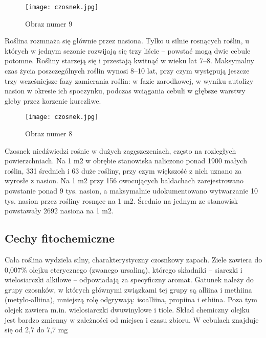 \begin{figure}
 \centering
 \texttt{[image: czosnek.jpg]}
 \caption{Obraz numer 9}
 \label{figure:example2}
\end{figure}

Roślina rozmnaża się głównie przez nasiona. Tylko u silnie rosnących roślin, u których w jednym sezonie rozwijają się trzy liście – powstać mogą dwie cebule potomne. Rośliny starzeją się i przestają kwitnąć w wieku lat 7–8. Maksymalny czas życia poszczególnych roślin wynosi 8–10 lat, przy czym występują jeszcze trzy wcześniejsze fazy zamierania roślin: w fazie zarodkowej, w wyniku autolizy nasion w okresie ich spoczynku, podczas wciągania cebuli w głębsze warstwy gleby przez korzenie kurczliwe.

\begin{figure}
 \centering
 \texttt{[image: czosnek.jpg]}
 \caption{Obraz numer 8}
 \label{figure:example3}
\end{figure}

Czosnek niedźwiedzi rośnie w dużych zagęszczeniach, często na rozległych powierzchniach. Na 1 m2 w obrębie stanowiska naliczono ponad 1900 małych roślin, 331 średnich i 63 duże rośliny, przy czym większość z nich uznano za wyrosłe z nasion. Na 1 m2 przy 156 owocujących baldachach zarejestrowano powstanie ponad 9 tys. nasion, a maksymalnie udokumentowano wytwarzanie 10 tys. nasion przez rośliny rosnące na 1 m2. Średnio na jednym ze stanowisk powstawały 2692 nasiona na 1 m2.

\subsection{Cechy fitochemiczne}
Cała roślina wydziela silny, charakterystyczny czosnkowy zapach. Ziele zawiera do 0,007\% olejku eterycznego (zwanego ursaliną), którego składniki – siarczki i wielosiarczki alkilowe – odpowiadają za specyficzny aromat. Gatunek należy do grupy czosnków, w których głównymi związkami tej grupy są alliina i methiina (metylo-alliina), mniejszą rolę odgrywają: isoalliina, propiina i ethiina. Poza tym olejek zawiera m.in. wielosiarczki dwuwinylowe i tiole. Skład chemiczny olejku jest bardzo zmienny w zależności od miejsca i czasu zbioru. W cebulach znajduje się od 2,7 do 7,7 mg%

